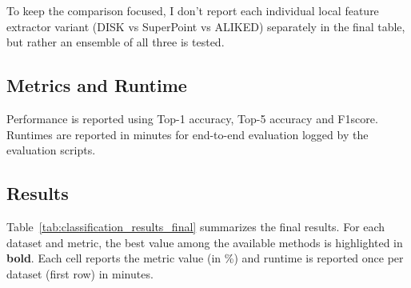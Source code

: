 To keep the comparison focused, I don't report each individual local feature extractor variant
 (DISK vs SuperPoint vs ALIKED) separately in the final table, but rather an ensemble of all three is tested.

\subsection{Metrics and Runtime}
Performance is reported using Top-1 accuracy, Top-5 accuracy and F1score. Runtimes are reported in minutes for end-to-end evaluation logged by the evaluation scripts. 

\subsection{Results}
\label{sec:results_classification_table}

Table~\ref{tab:classification_results_final} summarizes the final results. For each dataset and metric, 
the best value among the available methods is highlighted in \textbf{bold}. Each cell reports the metric value (in \%)
 and runtime is reported once per dataset (first row) in minutes.


